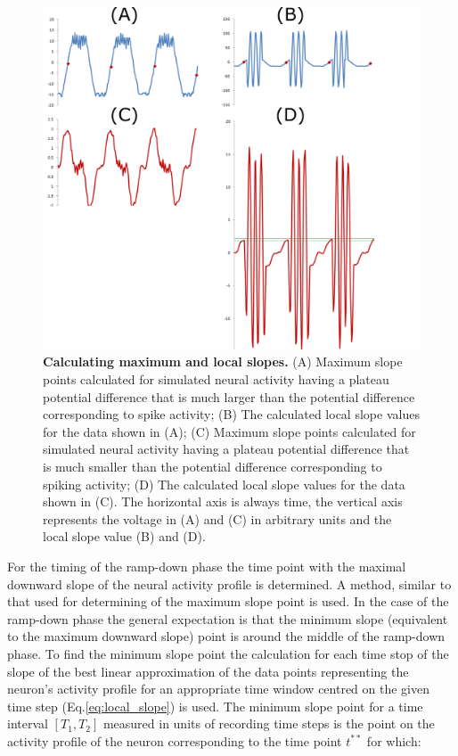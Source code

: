 \begin{figure}[H]
	\begin{center}
		\includegraphics[width=\columnwidth]{graphics/slopes.png}
		\caption[Calculating maximum and local slopes. ]{\textbf{Calculating maximum and local slopes. }(A) Maximum slope points calculated for simulated neural activity having a plateau potential difference that is much larger than the potential difference corresponding to spike activity; (B) The calculated local slope values for the data shown in (A); (C) Maximum slope points calculated for simulated neural activity having a plateau potential difference that is much smaller than the potential difference corresponding to spiking activity; (D) The calculated local slope values for the data shown in (C). The horizontal axis is always time, the vertical axis represents the voltage in (A) and (C) in arbitrary units and the local slope value (B) and (D).}
		\label{fig:slopes}
	\end{center}
\end{figure}

For the timing of the ramp-down phase the time point with the maximal downward slope of the neural activity profile is determined. A method, similar to that used for determining of the maximum slope point is used. In the case of the ramp-down phase the general expectation is that the minimum slope (equivalent to the maximum downward slope) point is around the middle of the ramp-down phase. To find the minimum slope point the calculation for each time stop of the slope of the best linear approximation of the data points representing the neuron's activity profile for an appropriate time window centred on the given time step (Eq.\ref{eq:local_slope}) is used. The minimum slope point for a time interval $[T_{1},T_{2}]$ measured in units of recording time steps is the point on the activity profile of the neuron corresponding to the time point $t^{**}$ for which:

